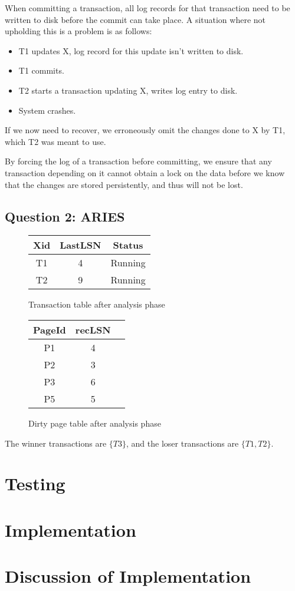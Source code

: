 \documentclass[11pt,a4paper]{article}
\begin{document}
When committing a transaction, all log records for that transaction need to be
written to disk before the commit can take place. A situation where not upholding
this is a problem is as follows:

\begin{itemize}
    \item T1 updates X, log record for this update isn't written to disk.
    \item T1 commits.
    \item T2 starts a transaction updating X, writes log entry to disk.
    \item System crashes.
\end{itemize}

If we now need to recover, we erroneously omit the changes done to X by T1,
which T2 was meant to use.

By forcing the log of a transaction before committing, we ensure that any
transaction depending on it cannot obtain a lock on the data before we know
that the changes are stored persistently, and thus will not be lost.

\subsection{Question 2: ARIES}

\begin{figure}[h!]
    \centering
\begin{tabular}{|c|c|c|}
    \hline
    Xid & LastLSN & Status \\
    \hline
    T1  & 4       & Running \\
    T2  & 9       & Running \\
    \hline
\end{tabular}
\caption{Transaction table after analysis phase}
\end{figure}

\begin{figure}[h!]
    \centering
\begin{tabular}{|c|c|c|}
    \hline
    PageId & recLSN \\
    \hline
    P1     & 4 \\
    P2     & 3 \\
    P3     & 6 \\
    P5     & 5 \\
    \hline
\end{tabular}
\caption{Dirty page table after analysis phase}
\end{figure}

The winner transactions are $\{T3\}$, and the loser transactions are $\{T1,
T2\}$.




\section{Testing}

\section{Implementation}

\section{Discussion of Implementation}
\end{document}
